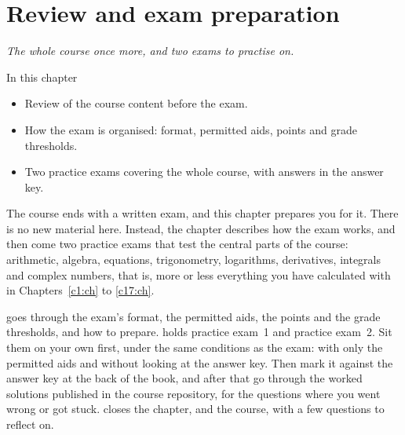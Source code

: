 
\chapter{Review and exam preparation}
\label{c19:ch}

{\large\itshape The whole course once more, and two exams to practise on.\par}

\begin{chapterbox}{In this chapter}
\begin{itemize}
  \item Review of the course content before the exam.
  \item How the exam is organised: format, permitted aids, points and grade thresholds.
  \item Two practice exams covering the whole course, with answers in the answer key.
\end{itemize}
\end{chapterbox}

The course ends with a written exam, and this chapter prepares you for it. There is no new
material here. Instead, the chapter describes how the exam works, and then come two practice exams
that test the central parts of the course: arithmetic, algebra, equations, trigonometry,
logarithms, derivatives, integrals and complex numbers, that is, more or less everything you have
calculated with in Chapters~\ref{c1:ch} to \ref{c17:ch}.

 goes through the exam's format, the permitted aids, the points
and the grade thresholds, and how to prepare.  holds practice
exam~1 and  practice exam~2. Sit them on your own first, under the same conditions as the exam: with only the permitted
aids and without looking at the answer key. Then mark it against the answer key at the back of
the book, and after that go through the worked solutions published in the course
repository, for the questions where you went wrong or got stuck. 
closes the chapter, and the course, with a few questions to reflect on.





